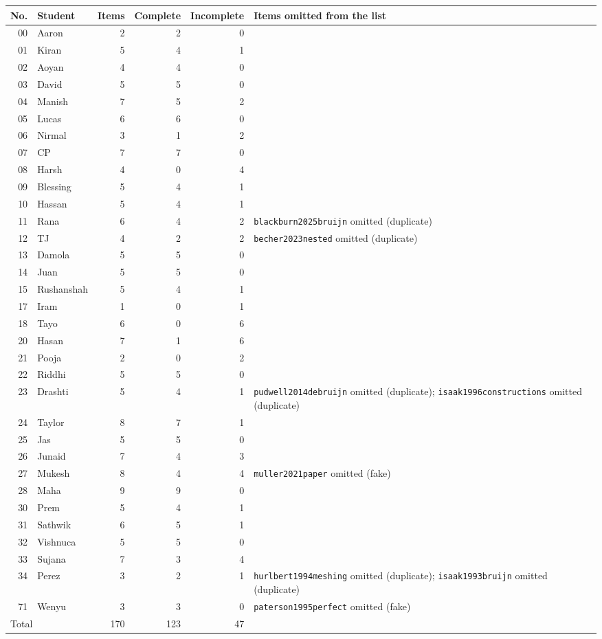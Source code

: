 \begin{center}\small
\begin{tabular}{|r|l|r|r|r|p{}|}
\hline
No. & Student & Items & Complete & Incomplete & Items omitted from the list \\
\hline
00 & Aaron & 2 & 2 & 0 & \raggedright  \tabularnewline
01 & Kiran & 5 & 4 & 1 & \raggedright  \tabularnewline
02 & Aoyan & 4 & 4 & 0 & \raggedright  \tabularnewline
03 & David & 5 & 5 & 0 & \raggedright  \tabularnewline
04 & Manish & 7 & 5 & 2 & \raggedright  \tabularnewline
05 & Lucas & 6 & 6 & 0 & \raggedright  \tabularnewline
06 & Nirmal & 3 & 1 & 2 & \raggedright  \tabularnewline
07 & CP & 7 & 7 & 0 & \raggedright  \tabularnewline
08 & Harsh & 4 & 0 & 4 & \raggedright  \tabularnewline
09 & Blessing & 5 & 4 & 1 & \raggedright  \tabularnewline
10 & Hassan & 5 & 4 & 1 & \raggedright  \tabularnewline
11 & Rana & 6 & 4 & 2 & \raggedright \texttt{blackburn2025bruijn} omitted (duplicate) \tabularnewline
12 & TJ & 4 & 2 & 2 & \raggedright \texttt{becher2023nested} omitted (duplicate) \tabularnewline
13 & Damola & 5 & 5 & 0 & \raggedright  \tabularnewline
14 & Juan & 5 & 5 & 0 & \raggedright  \tabularnewline
15 & Rushanshah & 5 & 4 & 1 & \raggedright  \tabularnewline
17 & Iram & 1 & 0 & 1 & \raggedright  \tabularnewline
18 & Tayo & 6 & 0 & 6 & \raggedright  \tabularnewline
20 & Hasan & 7 & 1 & 6 & \raggedright  \tabularnewline
21 & Pooja & 2 & 0 & 2 & \raggedright  \tabularnewline
22 & Riddhi & 5 & 5 & 0 & \raggedright  \tabularnewline
23 & Drashti & 5 & 4 & 1 & \raggedright \texttt{pudwell2014debruijn} omitted (duplicate); \texttt{isaak1996constructions} omitted (duplicate) \tabularnewline
24 & Taylor & 8 & 7 & 1 & \raggedright  \tabularnewline
25 & Jas & 5 & 5 & 0 & \raggedright  \tabularnewline
26 & Junaid & 7 & 4 & 3 & \raggedright  \tabularnewline
27 & Mukesh & 8 & 4 & 4 & \raggedright \texttt{muller2021paper} omitted (fake) \tabularnewline
28 & Maha & 9 & 9 & 0 & \raggedright  \tabularnewline
30 & Prem & 5 & 4 & 1 & \raggedright  \tabularnewline
31 & Sathwik & 6 & 5 & 1 & \raggedright  \tabularnewline
32 & Vishnuca & 5 & 5 & 0 & \raggedright  \tabularnewline
33 & Sujana & 7 & 3 & 4 & \raggedright  \tabularnewline
34 & Perez & 3 & 2 & 1 & \raggedright \texttt{hurlbert1994meshing} omitted (duplicate); \texttt{isaak1993bruijn} omitted (duplicate) \tabularnewline
71 & Wenyu & 3 & 3 & 0 & \raggedright \texttt{paterson1995perfect} omitted (fake) \tabularnewline
\hline
\multicolumn{2}{|l|}{Total} & 170 & 123 & 47 & \\
\hline
\end{tabular}
\end{center}
